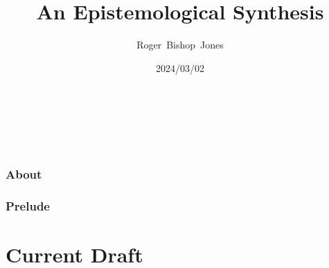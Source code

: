 \documentclass[10pt,titlepage]{book}
\title{\bf An Epistemological Synthesis}
\author{Roger~Bishop~Jones}
\date{\small 2024/03/02}
\newcommand{\ignore}[1]{}
\begin{document}
% 

                               
\begin{titlepage}
\maketitle





\end{titlepage}

\ \

\ignore{
\begin{centering}
{}
\end{centering}
}%

\setcounter{tocdepth}{2}
{\parskip-0pt\tableofcontents}


\hfill
\ 
\pagebreak







\section*{About}

\section*{Prelude}

\part{Current Draft}
\end{document}

